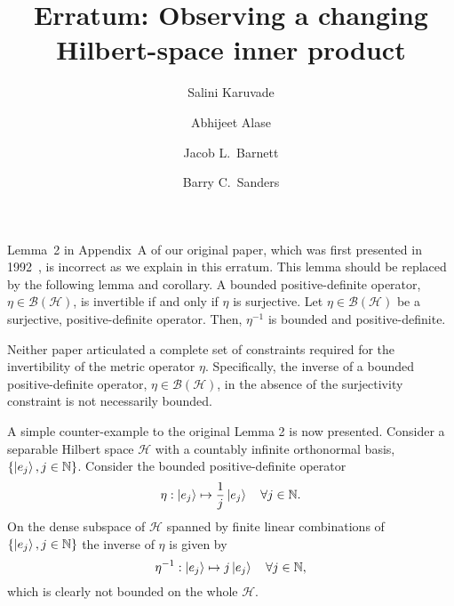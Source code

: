 \documentclass[amsmath,amssymb,aps,pra,superscriptaddress,twocolumn]{revtex4-2}
\newenvironment{customlemma}[1]
  {\renewcommand\theinnercustomlemma{#1}\innercustomlemma}
  {\endinnercustomlemma}
\newenvironment{customcor}[1]
  {\renewcommand\theinnercustomcor{#1}\innercustomcor}
  {\endinnercustomcor}
\begin{document}
\title{Erratum: Observing a changing Hilbert-space inner product}
\author{Salini Karuvade}
\author{Abhijeet Alase }

\author{Jacob L.\ Barnett}
\author{Barry C.\ Sanders}

\maketitle

\onecolumngrid
Lemma~2 
in Appendix~A of our original paper,
which was
first presented in 1992~\cite{SGH92},
is incorrect as we explain in this erratum.
This lemma should be replaced by the following lemma and corollary.
\begin{customlemma}{2}
A bounded positive-definite operator, $\eta\in\mathcal{B}\left(\mathscr{H}\right)$, is invertible if and only if $\eta$ is surjective. 
\end{customlemma} 
\begin{customcor}{2.1}\label{cor}
Let $\eta\in\mathcal{B}\left(\mathscr{H}\right)$ 
be a surjective, positive-definite operator.
Then, $\eta^{-1}$ is bounded and positive-definite.
\end{customcor} 

\noindent Neither paper articulated a complete set of constraints required for the invertibility of the metric 
operator $\eta$.
Specifically, the inverse of a bounded positive-definite operator, $\eta\in\mathcal{B}\left(\mathscr{H}\right)$,
in the absence of the surjectivity constraint
is not necessarily bounded. 

A simple counter-example  to the original Lemma 2 is now presented.
Consider a separable Hilbert space $\mathscr{H}$ with a countably infinite orthonormal basis, $\{\ket{e_j}, j \in \mathbb{N}\}$. Consider the bounded positive-definite operator 
\begin{equation}\label{eq:cex}
    \eta: \ket{e_j} \mapsto \frac{1}{j}\ket{e_j} \quad \forall j \in \mathbb{N}.
\end{equation}
On the dense subspace of $\mathscr{H}$ spanned by finite linear combinations of 
$\{\ket{e_j}, j \in \mathbb{N}\}$ the inverse of $\eta$ is given
by 
\begin{equation}
    \eta^{-1}:\ket{e_j} \mapsto j\ket{e_j} \quad \forall j \in \mathbb{N},
\end{equation}
which is clearly not bounded
on the whole $\mathscr{H}$.
\end{document}
